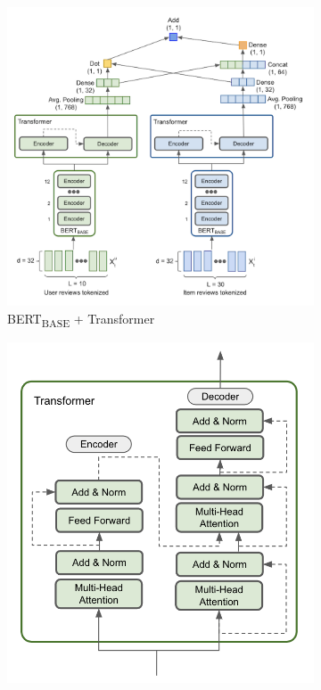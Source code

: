 \documentclass[11pt,a4paper]{article}
\begin{document}
\begin{figure}[t!]
     \centering
     \begin{subfigure}[b]{0.65\textwidth}
         \centering
         \includegraphics[width=\textwidth]{images/BERT+Transformer_Architecture_Diagram.png}
         \caption{BERT\textsubscript{BASE} + Transformer}
         \label{fig:f1}
     \end{subfigure}
     \hfill
     \begin{subfigure}[b]{0.3\textwidth}
         \centering
         \includegraphics[width=\textwidth]{images/Transformer_Block.png}

\end{subfigure}
\end{figure}
\end{document}
